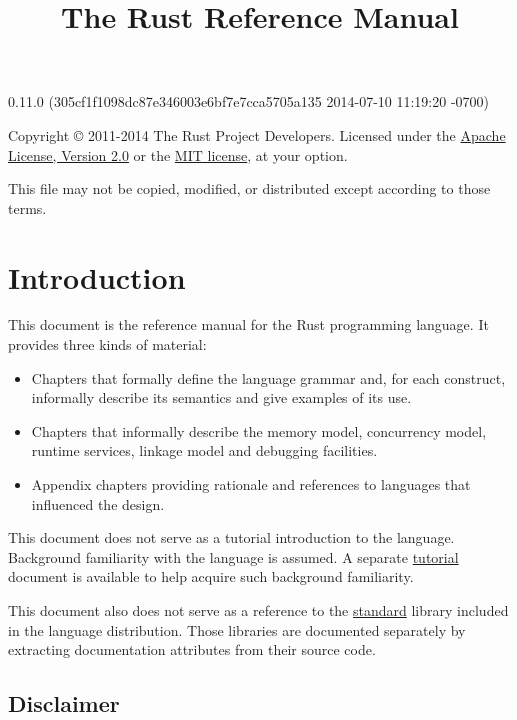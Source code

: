 \documentclass[]{article}
\title{The Rust Reference Manual}
\begin{document}
\maketitle

0.11.0 (305cf1f1098dc87e346003e6bf7e7cca5705a135 2014-07-10 11:19:20 -0700)

Copyright © 2011-2014 The Rust Project Developers. Licensed under the
\href{http://www.apache.org/licenses/LICENSE-2.0}{Apache License,
Version 2.0} or the \href{http://opensource.org/licenses/MIT}{MIT
license}, at your option.

This file may not be copied, modified, or distributed except according
to those terms.

{
\hypersetup{linkcolor=black}
\setcounter{tocdepth}{3}
\tableofcontents
}
\section{Introduction}\label{introduction}

This document is the reference manual for the Rust programming language.
It provides three kinds of material:

\begin{itemize}
\itemsep1pt\parskip0pt
\item
  Chapters that formally define the language grammar and, for each
  construct, informally describe its semantics and give examples of its
  use.
\item
  Chapters that informally describe the memory model, concurrency model,
  runtime services, linkage model and debugging facilities.
\item
  Appendix chapters providing rationale and references to languages that
  influenced the design.
\end{itemize}

This document does not serve as a tutorial introduction to the language.
Background familiarity with the language is assumed. A separate
\href{tutorial.html}{tutorial} document is available to help acquire
such background familiarity.

This document also does not serve as a reference to the
\href{std/index.html}{standard} library included in the language
distribution. Those libraries are documented separately by extracting
documentation attributes from their source code.

\subsection{Disclaimer}\label{disclaimer}
\end{document}
